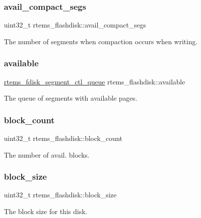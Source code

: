 \subsubsection{\texorpdfstring{avail\_compact\_segs}{avail\_compact\_segs}}
{\footnotesize\ttfamily uint32\+\_\+t rtems\+\_\+flashdisk\+::avail\+\_\+compact\+\_\+segs}

The number of segments when compaction occurs when writing. \mbox{\label{structrtems__flashdisk_a51504c8aca7771a241e98a587855c66b}} 
\subsubsection{\texorpdfstring{available}{available}}
{\footnotesize\ttfamily \mbox{\hyperlink{structrtems__fdisk__segment__ctl__queue}{rtems\+\_\+fdisk\+\_\+segment\+\_\+ctl\+\_\+queue}} rtems\+\_\+flashdisk\+::available}

The queue of segments with available pages. \mbox{\label{structrtems__flashdisk_aba4f374633a9848c3f88d9c3739037ce}} 
\subsubsection{\texorpdfstring{block\_count}{block\_count}}
{\footnotesize\ttfamily uint32\+\_\+t rtems\+\_\+flashdisk\+::block\+\_\+count}

The number of avail. blocks. \mbox{\label{structrtems__flashdisk_a49d6ba40e9f0b35165fc54aca51e4f9f}} 
\subsubsection{\texorpdfstring{block\_size}{block\_size}}
{\footnotesize\ttfamily uint32\+\_\+t rtems\+\_\+flashdisk\+::block\+\_\+size}

The block size for this disk. \mbox{\label{structrtems__flashdisk_a15f92f586a61129bd8cb99f12bbcd01d}} 
